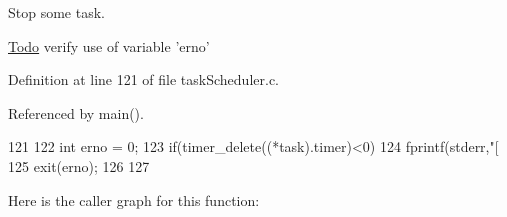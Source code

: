 Stop some task. 

\begin{Desc}
\item[\hyperlink{todo__todo000006}{Todo}]verify use of variable 'erno' \end{Desc}


Definition at line 121 of file taskScheduler.c.



Referenced by main().




\begin{DoxyCode}
121                                   {
122   int erno = 0;
123   if(timer_delete((*task).timer)<0){
124     fprintf(stderr,"[%
125     exit(erno);
126   }
127 }
\end{DoxyCode}




Here is the caller graph for this function:


